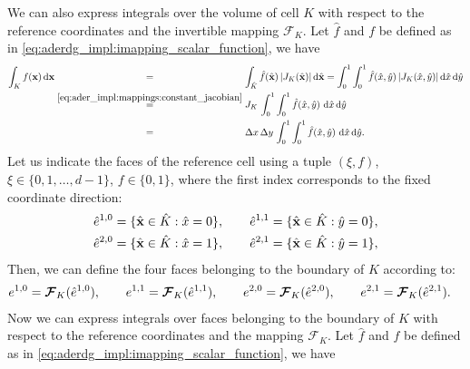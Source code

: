 \documentclass{scrreprt}
\theoremstyle{definition}
\theoremstyle{nonumberplain}
\renewcommand{\vec}[1]{{\textbf{#1}}}
\newcommand{\cell}{K}
\newcommand{\face}{e}
\newcommand{\dV}{\text{d}\vec{x}}
\newcommand{\intCell}{\int_\cell}
\newcommand{\refVec}[1]{\hat{\vec{#1}}}
\newcommand{\refCell}{\hat{\cell}}
\newcommand{\refFace}{\hat{\face}}
\newcommand{\mapping}{\boldsymbol{\mathcal{F}}_{\cell}}
\newcommand{\detJ}{J_\cell}
\newcommand{\intRefCell}{\int_{\hat{\cell}}}
\newcommand{\refdV}{\textup{d}\hat{\vec{x}}}
\newcommand{\refdx}{\textup{d}\hat{x}}
\newcommand{\refdy}{\textup{d}\hat{y}}
\begin{document}
We can also express integrals over the volume of cell $\cell$
with respect to the reference coordinates and the invertible mapping $\mapping$.
Let $\hat{f}$ and $f$ be defined as in \eqref{eq:aderdg_impl:imapping_scalar_function},
we have
\begin{align}
\intCell f(\vec{x})\,\dV 
&\overset{\phantom{\eqref{eq:ader_impl:mappings:constant_jacobian}}}{=} 
\intRefCell \hat{f}(\refVec{x})\,|\detJ(\refVec{x})|\,\refdV
= \int_{0}^1\int_{0}^1
\hat{f}(\hat{x},\hat{y})\,|\detJ(\hat{x},\hat{y})|\,\refdx\,\refdy \notag\\
&\overset{\eqref{eq:ader_impl:mappings:constant_jacobian}}{=}
\detJ\,
\int_{0}^1\int_{0}^1
\hat{f}(\hat{x},\hat{y})\,\,\refdx\,\refdy
\notag\\
&\overset{\phantom{\eqref{eq:ader_impl:mappings:constant_jacobian}}}{=}
\Delta x\,\Delta y\,
\int_{0}^1\int_{0}^1
\hat{f}(\hat{x},\hat{y})\,\,\refdx\,\refdy.
\notag
\end{align}
Let us indicate the faces of the reference cell 
using a tuple $(\xi, f)$, $\xi\in\{0,1,\ldots,d-1\}$, $f\in\{0,1\}$,
where the first index corresponds to the fixed coordinate direction:
\begin{align}
\refFace^{1,0} &= \{ \refVec{x} \in \refCell : \hat{x} = 0\},\qquad
\refFace^{1,1} =  \{ \refVec{x} \in \refCell : \hat{y} = 0\},
\notag\\
\refFace^{2,0} &= \{ \refVec{x} \in \refCell : \hat{x} = 1\},\qquad
\refFace^{2,1} =  \{ \refVec{x} \in \refCell : \hat{y} = 1\},
\notag
\end{align}
Then, we can define the four faces belonging to the boundary of $\cell$
according to:
\begin{align}
\face^{1,0} &= \mapping(\refFace^{1,0}),\qquad
\face^{1,1} =  \mapping(\refFace^{1,1}),\qquad
\face^{2,0} =  \mapping(\refFace^{2,0}),\qquad
\face^{2,1} =  \mapping(\refFace^{2,1}).
\notag
\end{align}
Now we can express integrals over faces belonging to the boundary of $\cell$ with respect to
the reference coordinates and the mapping $\mapping$.
Let $\hat{f}$ and $f$ be defined as in \eqref{eq:aderdg_impl:imapping_scalar_function},
we have
\end{document}
